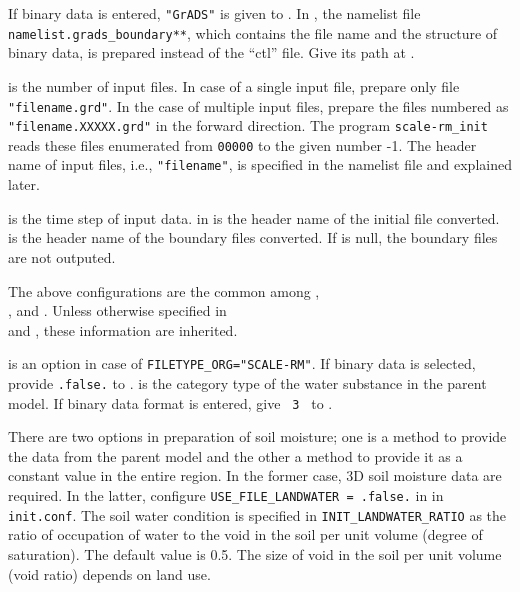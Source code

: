 If binary data is entered, \verb|"GrADS"| is given to .
In \scalerm, the namelist file \verb|namelist.grads_boundary**|, which contains the file name and the structure of binary data, is prepared instead of the ``ctl'' file. Give its path at .

 is the number of input files.
In case of a single input file, prepare only file \verb|"filename.grd"|.
In the case of multiple input files, prepare the files numbered as \verb|"filename.XXXXX.grd"| in the forward direction.
The program \verb|scale-rm_init| reads these files enumerated from \verb|00000| to the given number -1.
The header name of input files, i.e., \verb|"filename"|, is specified in the namelist file and explained later.

 is the time step of input data.
 in  is the header name of the initial file converted.
 is the header name of the boundary files converted.
If  is null, the boundary files are not outputed.

The above configurations are the common among ,\\ , and . Unless otherwise specified in\\
 and , these information are inherited.


 is an option in case of \verb|FILETYPE_ORG="SCALE-RM"|.
If binary data is selected, provide \verb|.false.| to .
 is the category type of the water substance in the parent model.
If binary data format is entered, give \verb| 3 | to .

There are two options in preparation of soil moisture; one is a method to provide the data from the parent model and the other a method to provide it as a constant value in the entire region.
In the former case, 3D soil moisture data are required. In the latter, configure \verb|USE_FILE_LANDWATER = .false.| in  in \verb|init.conf|.
The soil water condition is specified in \verb|INIT_LANDWATER_RATIO| as the ratio of occupation of water to the void in the soil per unit volume (degree of saturation). The default value is 0.5. The size of void in the soil per unit volume (void ratio) depends on land use.

